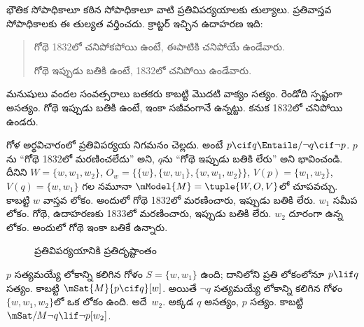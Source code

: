 \documentclass[../../../include/open-logic-section]{subfiles}
\begin{document}


భౌతిక సోపాధికాలూ కఠిన సోపాధికాలూ
వాటి ప్రతివిపర్యయాలకు తుల్యాలు.
ప్రతివాస్తవ సోపాధికాలకు ఈ తుల్యత వర్తించదు.
క్రాట్జర్ ఇచ్చిన ఉదాహరణ ఇది:
\begin{quote}
  గోథె 1832లో చనిపోకపోయి ఉంటే, ఈపాటికి చనిపోయే ఉండేవారు.

  గోథె ఇప్పుడు బతికి ఉంటే, 1832లో చనిపోయి ఉండేవారు.
\end{quote}
మనుషులు వందల సంవత్సరాలు బతకరు కాబట్టి మొదటి వాక్యం సత్యం.
రెండోది స్పష్టంగా అసత్యం. గోథె ఇప్పుడు బతికి ఉంటే,
ఇంకా సజీవంగానే ఉన్నట్టు. కనుక 1832లో చనిపోయి ఉండరు.

\begin{ex}
  గోళ అర్థవిచారంలో ప్రతివిపర్యయ
  నిగమనం చెల్లదు. అంటే $p
  \cif q \Entails/ \lnot q \cif \lnot p$.
  $p$ను ``గోథె 1832లో
  మరణించలేదు'' అని, $q$ను
  ``గోథె ఇప్పుడు బతికి లేరు'' అని భావించండి.
  దీనిని $W =
  \{w, w_1, w_2\}$,
  $O_w = \{\{w\}, \{w, w_1\},
  \{w, w_1, w_2\}\}$,
  $V(p) = \{w_1, w_2\}$,
  $V(q) = \{w, w_1\}$
  గల నమూనా $\mModel{M}
  = \tuple{W, O, V}$లో
  చూపవచ్చు.
  కాబట్టి $w$ వాస్తవ లోకం.
  అందులో గోథె 1832లో మరణించారు, ఇప్పుడు బతికి లేరు.
  $w_1$ సమీప లోకం.
  గోథె, ఉదాహరణకు 1833లో
  మరణించారు, ఇప్పుడు బతికి లేరు. $w_2$ దూరంగా ఉన్న లోకం.
  అందులో గోథె ఇంకా బతికే ఉన్నారు.
\begin{figure}
\begin{center}
\caption{ప్రతివిపర్యయానికి ప్రతిదృష్టాంతం}
\end{center}
\end{figure}
$p$ సత్యమయ్యే లోకాన్ని
కలిగిన గోళం $S =
\{w, w_1\}$ ఉంది;
దానిలోని ప్రతి లోకంలోనూ
$p \lif q$ సత్యం.
కాబట్టి $\mSat{M}{p
  \cif q}[w]$. అయితే
$\lnot q$ సత్యమయ్యే
లోకాన్ని కలిగిన గోళం
$\{w, w_1,
w_2\}$లో ఒక లోకం ఉంది.
అదే~$w_2$.
అక్కడ $q$ అసత్యం,
$p$ సత్యం. కాబట్టి
$\mSat/{M}{\lnot q \lif \lnot p}[w_2]$.
\end{ex}
\end{document}
